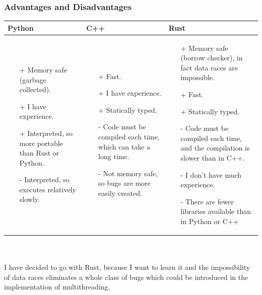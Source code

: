 \documentclass[12pt, a4paper]{report}
\begin{document}
\subsubsection{Advantages and Disadvantages}
\begin{tabular}{| p{} | p{} | p{} |}
	\hline
	 	Python                  & C++                      & Rust                      \\ \hline
	 	\begin{enumerate}
		 	\item[+] Memory safe (garbage collected).
		 	\item[+] I have experience.
		 	\item[+] Interpreted, so more portable than Rust or Python.
		 	\item[-] Interpreted, so executes relatively slowly.
	 	\end{enumerate}
	 	& \begin{enumerate}
		 	\item[+] Fast.
		 	\item[+] I have experience.
		 	\item[+] Statically typed.
		 	\item[-] Code must be compiled each time, which can take a long time.
		 	\item[-] Not memory safe, so bugs are more easily created.
	 	\end{enumerate}
	 	& \begin{enumerate}
	 		\item[+] Memory safe (borrow checker), in fact data races are impossible.
	 		\item[+] Fast.
	 		\item[+] Statically typed.
	 		\item[-] Code must be compiled each time, and the compilation is slower than in C++.
	 		\item[-] I don't have much experience.
	 		\item[-] There are fewer libraries available than in Python or C++
	 	\end{enumerate}
	\\ \hline
\end{tabular}
\\ \\
I have decided to go with Rust, because I want to learn it and the impossibility of data races eliminates a whole class of bugs which could be introduced in the implementation of multithreading.
\end{document}
